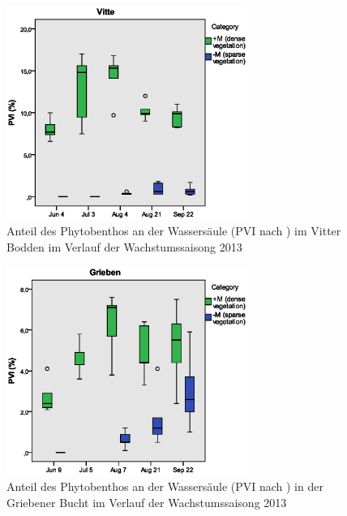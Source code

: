 \begin{figure}[!htb]
\centering
\includegraphics[width=0.70\textwidth]{images/pvi/boxplot_pvi1.eps}
\caption[PVI, Vitte]{Anteil des Phytobenthos an der Wassersäule (PVI nach \cite{jeppesen_1998}) im Vitter Bodden im Verlauf der Wachstumssaisong 2013}
\label{fig:pvi_vitte}
\end{figure}

\begin{figure}[!htb]
\centering
\includegraphics[width=0.70\textwidth]{images/pvi/boxplot_pvi2.eps}
\caption[PVI, Grieben]{Anteil des Phytobenthos an der Wassersäule (PVI nach \cite{jeppesen_1998}) in der Griebener Bucht im Verlauf der Wachstumssaisong 2013}
\label{fig:pvi_vitte}
\end{figure}

\FloatBarrier




